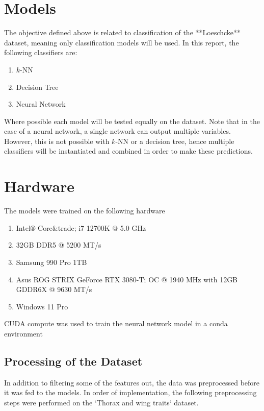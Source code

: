 \documentclass{article}
\begin{document}
\section{Models}

The objective defined above is related to classification of the **Loeschcke** dataset, meaning only classification models will be used. In this report, the following classifiers are:
\begin{enumerate}
    \item $k$-NN
    \item Decision Tree
    \item Neural Network
\end{enumerate}

Where possible each model will be tested equally on the dataset. Note that in the case of a neural network, a single network can output multiple variables. However, this is not possible with $k$-NN or a decision tree, hence multiple classifiers will be instantiated and combined in order to make these predictions.


\section{Hardware}

The models were trained on the following hardware

\begin{enumerate}
    \item Intel$\circledR$ Core&trade; i7 12700K @ 5.0 GHz
    \item 32GB DDR5 @ 5200 MT/s
    \item Samsung 990 Pro 1TB
    \item Asus ROG STRIX GeForce RTX 3080-Ti OC @ 1940 MHz with 12GB GDDR6X @ 9630 MT/s
    \item Windows 11 Pro
\end{enumerate}

CUDA compute was used to train the neural network model in a conda environment


\subsection{Processing of the Dataset}

In addition to filtering some of the features out, the data was preprocessed before it was fed to the models. In order of implementation, the following preprocessing steps were performed on the `Thorax and wing traits` dataset.
\end{document}
